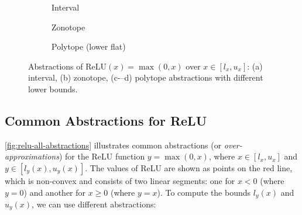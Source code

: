 \documentclass[oneside,11pt,dvipsnames]{book}
\numberwithin{equation}{section}
\theoremstyle{definition}
\theoremstyle{remark}
\newcommand{\myrelu}{\mathrm{ReLU}}
\begin{document}
\begin{figure}[h]
    \centering
    \begin{subfigure}{0.3\linewidth}
        \centering
        \caption{Interval}
        \label{fig:relu-interval-abstraction}
    \end{subfigure}
    \hfill
    \begin{subfigure}{0.3\linewidth}
        \centering
        \caption{Zonotope}
        \label{fig:relu-zonotope-abstraction}
    \end{subfigure}
    \hfill
    \begin{subfigure}{0.3\linewidth}
        \centering
        \caption{Polytope (lower flat)}
        \label{fig:relu-polytope-abstraction}
    \end{subfigure}
    \caption{Abstractions of $\myrelu(x) = \max(0,x)$ over $x \in [l_x, u_x]$: (a) interval, (b) zonotope, (c-–d) polytope abstractions with different lower bounds.}
    \label{fig:relu-all-abstractions}
\end{figure}

\subsection{Common Abstractions for ReLU}
\autoref{fig:relu-all-abstractions} illustrates common abstractions (or \emph{over-approximations}) for the ReLU function $y = \max(0, x)$, where $x \in [l_x, u_x]$ and $y \in [l_y(x), u_y(x)]$. The values of ReLU are shown as points on the \colorbox{myred}{red line}, which is non-convex and consists of two linear segments: one for $x < 0$ (where $y = 0$) and another for $x \geq 0$ (where $y = x$).
To compute the bounds $l_y(x)$ and $u_y(x)$, we can use different abstractions: 
\end{document}
